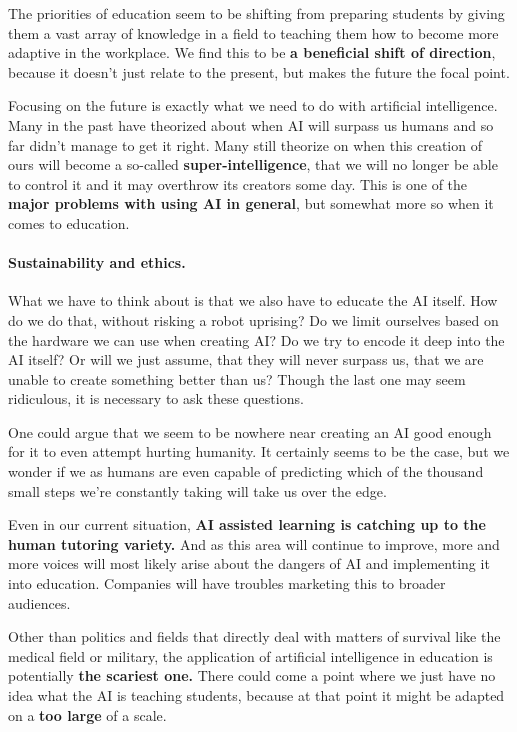 \documentclass[10pt,a4paper,]{article}
\begin{document}
The priorities of education seem to be shifting from preparing students by giving them a vast array of knowledge in a field to teaching them how to become more adaptive in the workplace.\cite{Roll2016} We find this to be \textbf{a beneficial shift of direction}, because it doesn't just relate to the present, but makes the future the focal point.

Focusing on the future is exactly what we need to do with artificial intelligence. Many in the past have theorized about when AI will surpass us humans and so far didn't manage to get it right. Many still theorize on when this creation of ours will become a so-called \textbf{super-intelligence}, that we will no longer be able to control it and it may overthrow its creators some day. This is one of the \textbf{major problems with using AI in general}, but somewhat more so when it comes to education.

\paragraph{Sustainability and ethics.}

What we have to think about is that we also have to educate the AI itself. How do we do that, without risking a robot uprising? Do we limit ourselves based on the hardware we can use when creating AI? Do we try to encode it deep into the AI itself? Or will we just assume, that they will never surpass us, that we are unable to create something better than us? Though the last one may seem ridiculous, it is necessary to ask these questions.

One could argue that we seem to be nowhere near creating an AI good enough for it to even attempt hurting humanity. It certainly seems to be the case, but we wonder if we as humans are even capable of predicting which of the thousand small steps we're constantly taking will take us over the edge.

Even in our current situation, \textbf{AI assisted learning is catching up to the human tutoring variety.}\cite{VanLehn2011} And as this area will continue to improve, more and more voices will most likely arise about the dangers of AI and implementing it into education. Companies will have troubles marketing this to broader audiences.\cite{KRAFFT2020}

Other than politics and fields that directly deal with matters of survival like the medical field or military, the application of artificial intelligence in education is potentially \textbf{the scariest one.} There could come a point where we just have no idea what the AI is teaching students, because at that point it might be adapted on a \textbf{too large} of a scale.
\end{document}
